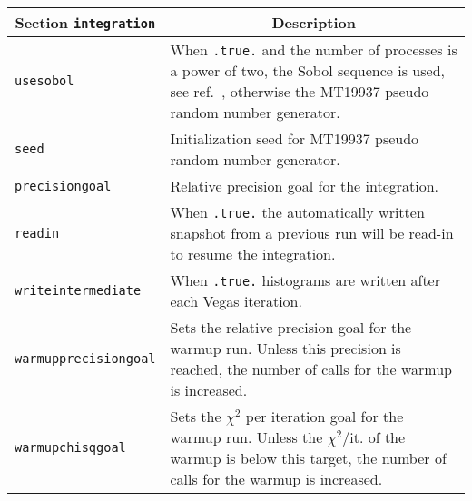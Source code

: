 	\begin{longtable}{p{1.5cm}p{12cm}}
		\toprule
		\multicolumn{1}{c}{{\textbf{Section} \texttt{integration}}} & \multicolumn{1}{c}{{\textbf{Description}}} \\ 
		\midrule
		\texttt{usesobol} & When \texttt{.true.} and the number of \MPI{} processes is a power of two, the Sobol 
		sequence is used, see ref.~\cite{MCFM9}, otherwise the {\abbrev MT19937} pseudo random number generator. \\
		\texttt{seed} & Initialization seed for {\abbrev MT19937} pseudo random number generator. \\
		\texttt{precisiongoal} & Relative precision goal for the integration. \\
		\texttt{readin} & When \texttt{.true.} the automatically written snapshot from a previous run will be read-in
		to resume the integration. \\
		\texttt{writeintermediate} & When \texttt{.true.} histograms are written after each Vegas iteration. \\
		\texttt{warmupprecisiongoal} & Sets the relative precision goal for the warmup run. Unless this precision
		is reached, the number of calls for the warmup is increased. \\
		\texttt{warmupchisqgoal} & Sets the $\chi^2$ per iteration goal for the warmup run. Unless the 
		$\chi^2/\text{it.}$ of the warmup is below this target, the number of calls for the warmup is increased. \\
		\bottomrule
	\end{longtable}
\clearpage
